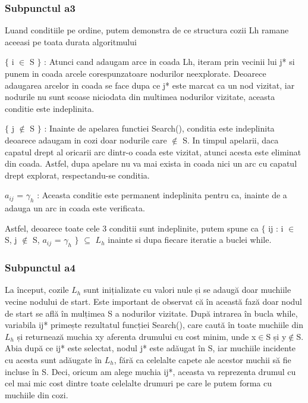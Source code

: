 \documentclass{article}
\begin{document}
\subsubsection*{\fontsize{14}{20}\selectfont Subpunctul a3}
{\fontsize{14}{16}\selectfont
Luand conditiile pe ordine, putem demonstra de ce structura cozii Lh ramane aceeasi pe toata durata algoritmului

$\lbrace$ i $\in$ S $\rbrace$ : Atunci cand adaugam arce in coada Lh, iteram prin vecinii lui j* si punem in coada arcele corespunzatoare nodurilor neexplorate. Deoarece adaugarea arcelor in coada se face dupa ce j* este marcat ca un nod vizitat, iar nodurile nu sunt scoase niciodata din multimea nodurilor vizitate, aceasta conditie este indeplinita.

$\lbrace$ j $\notin$ S $\rbrace$ : Inainte de apelarea functiei Search(), conditia este indeplinita deoarece adaugam in cozi doar nodurile care $\notin$ S. In timpul apelarii, daca capatul drept al oricarii arc dintr-o coada este vizitat, atunci acesta este eliminat din coada. Astfel, dupa apelare nu va mai exista in coada nici un arc cu capatul drept explorat, respectandu-se conditia.

$a_{ij}$ = $\gamma_h$ : Aceasta conditie este permanent indeplinita pentru ca, inainte de a adauga un arc in coada este verificata.

Astfel, deoarece toate cele 3 conditii sunt indeplinite, putem spune ca $\lbrace$ ij : i $\in$ S, j $\notin$ S, $a_{ij}$ = $\gamma_h$ $\rbrace$ $\subseteq$ $L_h$ inainte si dupa fiecare iteratie a buclei while.

}

\subsubsection*{\fontsize{14}{20}\selectfont Subpunctul a4}
{\fontsize{14}{16}\selectfont

La început, cozile $L_h$ sunt inițializate cu valori nule și se adaugă doar muchiile vecine nodului de start. Este important de observat că în această fază doar nodul de start se află în mulțimea S a nodurilor vizitate. După intrarea în bucla while, variabila ij* primește rezultatul funcției Search(), care caută în toate muchiile din $L_h$ și returnează muchia xy aferenta drumului cu cost minim, unde x$\in$S și y$\notin$S. Abia după ce ij* este selectat, nodul j* este adăugat în S, iar muchiile incidente cu acesta sunt adăugate în $L_h$, fără ca celelalte capete ale acestor muchii să fie incluse în S. Deci, oricum am alege muchia ij*, aceasta va reprezenta drumul cu cel mai mic cost dintre toate celelalte drumuri pe care le putem forma cu muchiile din cozi.

}
\end{document}
